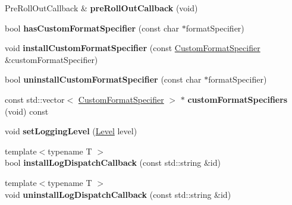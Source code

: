 \begin{DoxyCompactItemize}
\item 
Pre\+Roll\+Out\+Callback \& {\bfseries pre\+Roll\+Out\+Callback} (void)\hypertarget{classel_1_1base_1_1Storage_a90a3a886437746acae51cacbd5731572}{}\label{classel_1_1base_1_1Storage_a90a3a886437746acae51cacbd5731572}

\item 
bool {\bfseries has\+Custom\+Format\+Specifier} (const char $\ast$format\+Specifier)\hypertarget{classel_1_1base_1_1Storage_ae953cb6e8acafa96c5c1ab2f4826a4a5}{}\label{classel_1_1base_1_1Storage_ae953cb6e8acafa96c5c1ab2f4826a4a5}

\item 
void {\bfseries install\+Custom\+Format\+Specifier} (const \hyperlink{classel_1_1CustomFormatSpecifier}{Custom\+Format\+Specifier} \&custom\+Format\+Specifier)\hypertarget{classel_1_1base_1_1Storage_a355aac8191ab98869a52394cc868a315}{}\label{classel_1_1base_1_1Storage_a355aac8191ab98869a52394cc868a315}

\item 
bool {\bfseries uninstall\+Custom\+Format\+Specifier} (const char $\ast$format\+Specifier)\hypertarget{classel_1_1base_1_1Storage_a68e1d3e0b657418ddb0f62f60fe979d2}{}\label{classel_1_1base_1_1Storage_a68e1d3e0b657418ddb0f62f60fe979d2}

\item 
const std\+::vector$<$ \hyperlink{classel_1_1CustomFormatSpecifier}{Custom\+Format\+Specifier} $>$ $\ast$ {\bfseries custom\+Format\+Specifiers} (void) const \hypertarget{classel_1_1base_1_1Storage_aaafbc69cac920ec79f60e1cf4c2c12d6}{}\label{classel_1_1base_1_1Storage_aaafbc69cac920ec79f60e1cf4c2c12d6}

\item 
void {\bfseries set\+Logging\+Level} (\hyperlink{namespaceel_ab0ac6091262344c52dd2d3ad099e8e36}{Level} level)\hypertarget{classel_1_1base_1_1Storage_a163473357c32184769e8edd993c8b440}{}\label{classel_1_1base_1_1Storage_a163473357c32184769e8edd993c8b440}

\item 
{\footnotesize template$<$typename T $>$ }\\bool {\bfseries install\+Log\+Dispatch\+Callback} (const std\+::string \&id)\hypertarget{classel_1_1base_1_1Storage_aec36c8e770c0ac354e74d57aba1cfa03}{}\label{classel_1_1base_1_1Storage_aec36c8e770c0ac354e74d57aba1cfa03}

\item 
{\footnotesize template$<$typename T $>$ }\\void {\bfseries uninstall\+Log\+Dispatch\+Callback} (const std\+::string \&id)\hypertarget{classel_1_1base_1_1Storage_a34c2c9f8abff647e22e1ee0b52357f88}{}\label{classel_1_1base_1_1Storage_a34c2c9f8abff647e22e1ee0b52357f88}


\end{DoxyCompactItemize}
